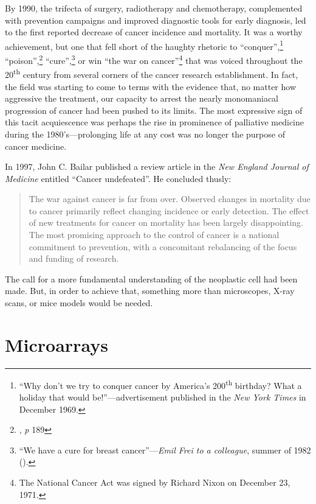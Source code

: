 By 1990, the trifecta of surgery, radiotherapy and chemotherapy, complemented
with prevention campaigns and improved diagnostic tools for early diagnosis, led
to the first reported decrease of cancer incidence and
mortality.\cite{devita_two_2012} It was a worthy achievement, but one that fell
short of the haughty rhetoric to ``conquer'',\footnote{``Why don't we try to
  conquer cancer by America's 200\textsuperscript{th} birthday? What a holiday
  that would be!''---advertisement published in the \emph{New York Times} in
  December 1969.} ``poison'',\footnote{\citealp{shorter_health_1987}, \emph{p}
  189} ``cure'',\footnote{``We have a cure for breast cancer''---\emph{Emil Frei
    to a colleague}, summer of 1982 (\citealp{mukherjee_emperor_2011}).} or win
``the war on cancer''\footnote{The National Cancer Act was signed by Richard
  Nixon on December 23, 1971.} that was voiced throughout the
20\textsuperscript{th} century from several corners of the cancer research
establishment.  In fact, the field was starting to come to terms with the
evidence that, no matter how aggressive the
treatment,\cite{berry_high-dose_2011} our capacity to arrest the nearly
monomaniacal progression of cancer had been pushed to its limits.  The most
expressive sign of this tacit acquiescence was perhaps the rise in prominence of
palliative medicine during the 1980's---prolonging life at any cost was no
longer the purpose of cancer medicine.

\medskip

In 1997, John C. Bailar published a review article in the \emph{New England
  Journal of Medicine} entitled ``Cancer undefeated''.\cite{bailar_cancer_1997}
He concluded thusly:

\begin{quotation}
  The war against cancer is far from over.  Observed changes in mortality due to
  cancer primarily reflect changing incidence or early detection.  The effect of
  new treatments for cancer on mortality has been largely disappointing.  The
  most promising approach to the control of cancer is a national commitment to
  prevention, with a concomitant rebalancing of the focus and funding of
  research.
\end{quotation}

The call for a more fundamental understanding of the neoplastic cell had been
made. But, in order to achieve that, something more than microscopes,
X-ray scans, or mice models would be needed.

\bigskip

\section{Microarrays}

